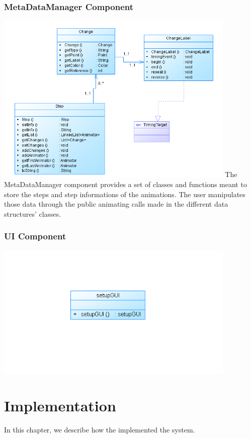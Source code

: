 \documentclass{l3proj}
\begin{document}
\subsection{MetaDataManager Component}
\includegraphics[width=115mm]{images/metaDataDiagram.png}
The MetaDataManager component provides a set of classes and functions meant to store the steps and step informations of the animations. The user manipulates
those data through the public animating calls made in the different data structures' classes.
\subsection{UI Component}
\includegraphics[width=115mm]{images/UIDiagram.png}
\chapter{Implementation}
\label{impl}

In this chapter, we describe how the implemented the system.

\end{document}
